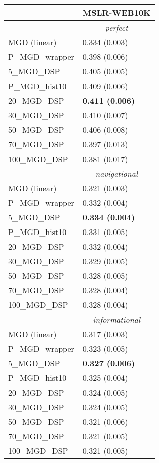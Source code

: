 \begin{tabular*}{\textwidth}{@{\extracolsep{\fill} } l  l  }
\toprule
 & { \small \textbf{MSLR-WEB10K}} \\
\midrule
& \multicolumn{1}{|c|}{\textit{perfect}} \\
\midrule
MGD (linear) & 0.334 {\tiny (0.003)} \\
P\_MGD\_wrapper & 0.398 {\tiny (0.006)} \\
5\_MGD\_DSP & 0.405 {\tiny (0.005)} \\
P\_MGD\_hist10 & 0.409 {\tiny (0.006)} \\
20\_MGD\_DSP & \bf 0.411 {\tiny (0.006)} \\
30\_MGD\_DSP & 0.410 {\tiny (0.007)} \\
50\_MGD\_DSP & 0.406 {\tiny (0.008)} \\
70\_MGD\_DSP & 0.397 {\tiny (0.013)} \\
100\_MGD\_DSP & 0.381 {\tiny (0.017)} \\
\midrule
& \multicolumn{1}{|c|}{\textit{navigational}} \\
\midrule
MGD (linear) & 0.321 {\tiny (0.003)} \\
P\_MGD\_wrapper & 0.332 {\tiny (0.004)} \\
5\_MGD\_DSP & \bf 0.334 {\tiny (0.004)} \\
P\_MGD\_hist10 & 0.331 {\tiny (0.005)} \\
20\_MGD\_DSP & 0.332 {\tiny (0.004)} \\
30\_MGD\_DSP & 0.329 {\tiny (0.005)} \\
50\_MGD\_DSP & 0.328 {\tiny (0.005)} \\
70\_MGD\_DSP & 0.328 {\tiny (0.004)} \\
100\_MGD\_DSP & 0.328 {\tiny (0.004)} \\
\midrule
& \multicolumn{1}{|c|}{\textit{informational}} \\
\midrule
MGD (linear) & 0.317 {\tiny (0.003)} \\
P\_MGD\_wrapper & 0.323 {\tiny (0.005)} \\
5\_MGD\_DSP & \bf 0.327 {\tiny (0.006)} \\
P\_MGD\_hist10 & 0.325 {\tiny (0.004)} \\
20\_MGD\_DSP & 0.324 {\tiny (0.005)} \\
30\_MGD\_DSP & 0.324 {\tiny (0.005)} \\
50\_MGD\_DSP & 0.321 {\tiny (0.006)} \\
70\_MGD\_DSP & 0.321 {\tiny (0.005)} \\
100\_MGD\_DSP & 0.321 {\tiny (0.005)} \\
\bottomrule
\end{tabular*}
